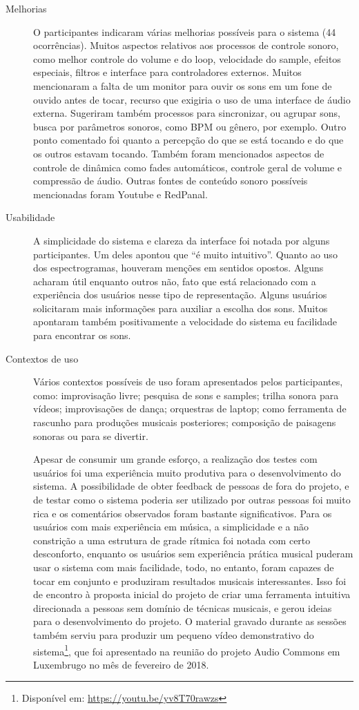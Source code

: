 \begin{description}
\item[Melhorias] O participantes indicaram várias melhorias possíveis para o sistema (44 ocorrências). Muitos aspectos relativos aos processos de controle sonoro, como melhor controle do volume e do loop, velocidade do sample, efeitos especiais, filtros e interface para controladores externos. Muitos mencionaram a falta de um monitor para ouvir os sons em um fone de ouvido antes de tocar, recurso que exigiria o uso de uma interface de áudio externa. Sugeriram também processos para sincronizar, ou agrupar sons, busca por parâmetros sonoros, como BPM ou gênero, por exemplo. Outro ponto comentado foi quanto a percepção do que se está tocando e do que os outros estavam tocando. Também foram mencionados aspectos de controle de dinâmica como fades automáticos, controle geral de volume e compressão de áudio. Outras fontes de conteúdo sonoro possíveis mencionadas foram Youtube e RedPanal.

\item[Usabilidade] A simplicidade do sistema e clareza da interface foi notada por alguns participantes. Um deles apontou que ``é muito intuitivo''. Quanto ao uso dos espectrogramas, houveram menções em sentidos opostos. Alguns acharam útil enquanto outros não, fato que está relacionado com a experiência dos usuários nesse tipo de representação. Alguns usuários solicitaram mais informações para auxiliar a escolha dos sons. Muitos apontaram também positivamente a velocidade do sistema eu facilidade para encontrar os sons.

\item[Contextos de uso] Vários contextos possíveis de uso foram apresentados pelos participantes, como: improvisação livre; pesquisa de sons e samples; trilha sonora para vídeos; improvisações de dança; orquestras de laptop; como ferramenta de rascunho para produções musicais posteriores; composição de paisagens sonoras ou para se divertir.

Apesar de consumir um grande esforço, a realização dos testes com usuários foi uma experiência muito produtiva para o desenvolvimento do sistema. A possibilidade de obter feedback de pessoas de fora do projeto, e de testar como o sistema poderia ser utilizado por outras pessoas foi muito rica e os comentários observados foram bastante significativos. Para os usuários com mais experiência em música, a simplicidade e a não constrição a uma estrutura de grade rítmica foi notada com certo desconforto, enquanto os usuários sem experiência prática musical puderam usar o sistema com mais facilidade, todo, no entanto, foram capazes de tocar em conjunto e produziram resultados musicais interessantes. Isso foi de encontro à proposta inicial do projeto de criar uma ferramenta intuitiva direcionada a pessoas sem domínio de técnicas musicais, e gerou ideias para o desenvolvimento do projeto. O material gravado durante as sessões também serviu para produzir um pequeno vídeo demonstrativo do sistema\footnote{Disponível em: \url{https://youtu.be/yv8T70rawzs}}, que foi apresentado na reunião do projeto Audio Commons em Luxembrugo no mês de fevereiro de 2018. 




\end{description}

